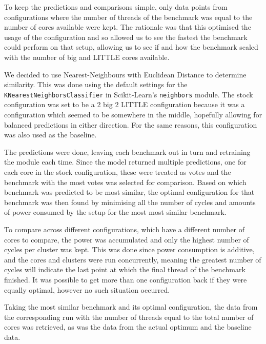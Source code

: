     To keep the predictions and comparisons simple, only data points from 
    configurations where the number of threads of the benchmark was equal to 
    the number of cores available were kept. The rationale was that this 
    optimised the usage of the configuration and so allowed us to see the 
    fastest the benchmark could perform on that setup, allowing us to see if and
    how the benchmark scaled with the number of big and LITTLE cores available.
    
    We decided to use Nearest-Neighbours with Euclidean Distance to determine 
    similarity. This was done using the default settings for the 
    \texttt{KNearestNeighborsClassifier} in Scikit-Learn's 
    \cite{pedregosa_scikit-learn_2011} \texttt{neighbors} module. The stock 
    configuration was set to be a 2 big 2 LITTLE configuration because it was a 
    configuration which seemed to be somewhere in the middle, hopefully 
    allowing for balanced predictions in either direction. For the same reasons,
    this configuration was also used as the baseline.
    
    The predictions were done, leaving each benchmark out in turn and 
    retraining the module each time. Since the model returned multiple 
    predictions, one for each core in the stock configuration, these were 
    treated as votes and the benchmark with the most votes was selected for 
    comparison. Based on which benchmark was predicted to be most similar, the 
    optimal configuration for that benchmark was then found by minimising all 
    the number of cycles and amounts of power consumed by the setup for the most
    most similar benchmark.
    
    To compare across different configurations, which have a different number 
    of cores to compare, the power was accumulated and only the highest number 
    of cycles per cluster was kept. This was done since power consumption is 
    additive, and the cores and clusters were run concurrently, meaning the 
    greatest number of cycles will indicate the last point at which the final 
    thread of the benchmark finished. It was possible to get more than one 
    configuration back if they were equally optimal, however no such situation 
    occurred.
    
    Taking the most similar benchmark and its optimal configuration, the data 
    from the corresponding run with the number of threads equal to the total 
    number of cores was retrieved, as was the data from the actual optimum and
    the baseline data.
    
